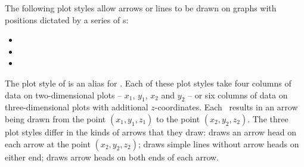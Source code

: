 The following plot styles allow arrows or lines to be drawn on graphs with
positions dictated by a series of \datapoint s:
\begin{itemize}
\item {}
\item {}
\item {}
\end{itemize}
The plot style of  is an alias for .  Each
of these plot styles take four columns of data on two-dimensional plots --
$x_1$, $y_1$, $x_2$ and $y_2$ -- or six columns of data on three-dimensional
plots with additional $z$-coordinates. Each \datapoint\ results in an arrow
being drawn from the point $(x_1,y_1,z_1)$ to the point $(x_2,y_2,z_2)$. The
three plot styles differ in the kinds of arrows that they draw:
 draws an arrow head on each arrow at the point
$(x_2,y_2,z_2)$;  draws simple lines without arrow heads
on either end;  draws arrow heads on both ends of each
arrow.

